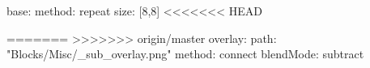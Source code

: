 base:
  method: repeat
  size: [8,8]
<<<<<<< HEAD

=======
>>>>>>> origin/master
overlay:
  path: "Blocks/Misc/_sub_overlay.png"
  method: connect
  blendMode: subtract
